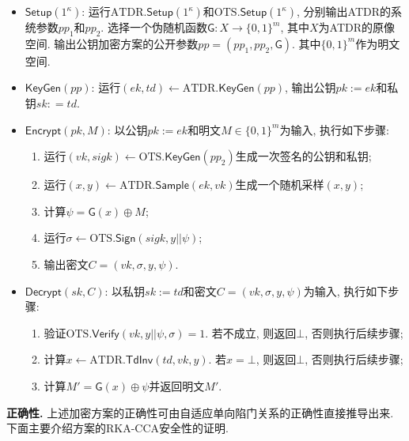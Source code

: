 \begin{construction}\label{construction:Wee-PKE}
\begin{itemize}
\item $\mathsf{Setup}(1^\kappa)$: 运行$\text{ATDR}.\mathsf{Setup}(1^\kappa)$和$\text{OTS}.\mathsf{Setup}(1^\kappa)$, 分别输出ATDR的系统参数$pp_1$和$pp_2$. 选择一个伪随机函数$\mathsf{G}: X \rightarrow \{0, 1\}^m$, 其中$X$为ATDR的原像空间. 输出公钥加密方案的公开参数$pp = (pp_1, pp_2, \mathsf{G})$. 其中$\{0, 1\}^m$作为明文空间.

\item $\mathsf{KeyGen}(pp)$: 运行$(ek, td) \leftarrow \text{ATDR}.\mathsf{KeyGen}(pp)$, 输出公钥$pk := ek$和私钥$sk: = td$. 
  
\item $\mathsf{Encrypt}(pk, M)$: 以公钥$pk := ek$和明文$M \in \{0, 1\}^m$为输入, 执行如下步骤:
\begin{enumerate}
    \item 运行$(vk, sigk) \leftarrow \text{OTS}.\mathsf{KeyGen}(pp_2)$生成一次签名的公钥和私钥;
    \item 运行$(x, y) \leftarrow \text{ATDR}.\mathsf{Sample}(ek, vk)$生成一个随机采样$(x, y)$; 
    \item 计算$\psi = \mathsf{G}(x)\oplus M$;
    \item 运行$\sigma \leftarrow \text{OTS}.\mathsf{Sign}(sigk, y||\psi)$;
    \item 输出密文$C = (vk, \sigma, y, \psi)$. 
\end{enumerate} 

\item $\mathsf{Decrypt}(sk, C)$: 以私钥$sk := td$和密文$C = (vk, \sigma, y, \psi)$为输入, 执行如下步骤:
\begin{enumerate}
    \item 验证$\text{OTS}.\mathsf{Verify}(vk, y||\psi, \sigma) = 1$. 若不成立, 则返回$\bot$, 否则执行后续步骤;
    \item 计算$x \leftarrow \text{ATDR}.\mathsf{TdInv}(td, vk, y)$. 若$x = \bot$, 则返回$\bot$, 否则执行后续步骤; 
    \item 计算$M' = \mathsf{G}(x) \oplus \psi$并返回明文$M'$. 
\end{enumerate} 
\end{itemize}
\end{construction}

\begin{trivlist}
\item \textbf{正确性.} 上述加密方案的正确性可由自适应单向陷门关系的正确性直接推导出来. 下面主要介绍方案的RKA-CCA安全性的证明.
\end{trivlist}

